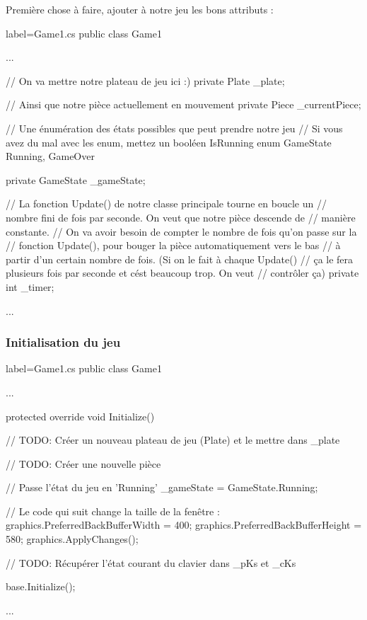 \documentclass[a4paper]{article}
\begin{document}
Première chose à faire, ajouter à notre jeu les bons attributs :

\begin{csharpcode*}{label=Game1.cs}
public class Game1
{
    ...


    // On va mettre notre plateau de jeu ici :)
    private Plate _plate;

    // Ainsi que notre pièce actuellement en mouvement
    private Piece _currentPiece;

    // Une énumération des états possibles que peut prendre notre jeu
    // Si vous avez du mal avec les enum, mettez un booléen IsRunning
    enum GameState { Running, GameOver }

    private GameState _gameState;
    
    // La fonction Update() de notre classe principale tourne en boucle un
    // nombre fini de fois par seconde. On veut que notre pièce descende de
    // manière constante.
    // On va avoir besoin de compter le nombre de fois qu'on passe sur la
    // fonction Update(), pour bouger la pièce automatiquement vers le bas
    // à partir d'un certain nombre de fois. (Si on le fait à chaque Update()
    // ça le fera plusieurs fois par seconde et cést beaucoup trop. On veut
    // contrôler ça)
    private int _timer;

    ...
}
\end{csharpcode*}

\subsubsection{Initialisation du jeu}

\begin{csharpcode*}{label=Game1.cs}
public class Game1
{
    ...

    protected override void Initialize()
    {
        // TODO: Créer un nouveau plateau de jeu (Plate) et le mettre dans _plate
        
        // TODO: Créer une nouvelle pièce
        
        // Passe l'état du jeu en 'Running'
        _gameState = GameState.Running;

        // Le code qui suit change la taille de la fenêtre :
        graphics.PreferredBackBufferWidth = 400;
        graphics.PreferredBackBufferHeight = 580;
        graphics.ApplyChanges();

        // TODO: Récupérer l'état courant du clavier dans _pKs et _cKs

        base.Initialize();
    }

    ...
}
\end{csharpcode*}
\end{document}
